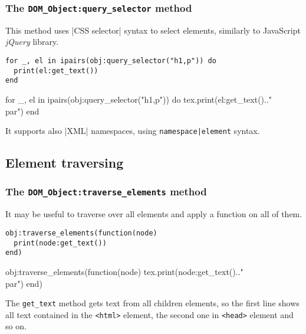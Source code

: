 \documentclass{ltxdoc}
\begin{document}
\subsubsection{The \texttt{DOM\_Object:query\_selector} method}

This method uses |CSS selector| syntax to select elements, similarly to JavaScript \textit{jQuery} library.

\begin{verbatim}
for _, el in ipairs(obj:query_selector("h1,p")) do
  print(el:get_text())
end
\end{verbatim}


\begin{framed}
  \begin{luacode*}
for _, el in ipairs(obj:query_selector("h1,p")) do
  tex.print(el:get_text().."\\par")
end
  \end{luacode*}
\end{framed}

It supports also |XML| namespaces, using \verb_namespace|element_ syntax.

\subsection{Element traversing}

\subsubsection{The \texttt{DOM\_Object:traverse\_elements} method}

It may be useful to traverse over all elements and apply a function on all of them. 

\begin{verbatim}
obj:traverse_elements(function(node)
  print(node:get_text())
end)
\end{verbatim}

\begin{framed}
  \begin{luacode*}
obj:traverse_elements(function(node)
  tex.print(node:get_text().."\\par")
end)
  \end{luacode*}
\end{framed}

The \verb|get_text| method gets text from all children elements, so the first
line shows all text contained in the \verb|<html>| element, the second one in
\verb|<head>| element and so on.  
\end{document}
